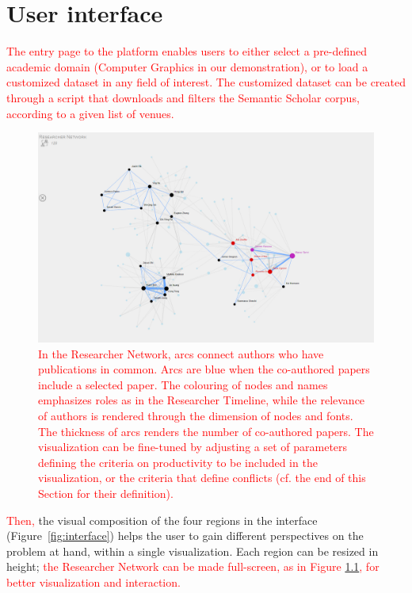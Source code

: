 \chapter{User interface}
\label{sec:userinterface}

\textcolor{red}{The entry page to the platform enables users to either select a pre-defined academic domain (Computer Graphics in our demonstration), or to load a customized dataset in any field of interest. The customized dataset can be created through a script that downloads and filters the Semantic Scholar corpus, according to a given list of venues.}

\begin{figure}[!t]
    \centering
    \includegraphics[width=\textwidth]{fig/researcher_network.png}
    \caption{\textcolor{red}{In the Researcher Network, arcs connect authors who have publications in common.  Arcs are blue when the co-authored papers include a selected paper. The colouring of nodes \textcolor{red}{and names} emphasizes roles as in the Researcher Timeline, while the relevance of authors is rendered through the dimension of nodes \textcolor{red}{and fonts}. The thickness of arcs renders the number of co-authored papers. The visualization can be fine-tuned by adjusting a set of parameters defining the criteria on productivity to be included in the visualization, or the criteria that define conflicts (cf. the end of this Section for their definition).}}%
    \label{fig:communities}
\end{figure}

\textcolor{red}{Then,} the visual composition of the four regions in the interface (Figure~\ref{fig:interface}) helps the user to gain different perspectives on the problem at hand, within a single visualization. Each region can be resized in height; \textcolor{red}{the Researcher Network can be made full-screen, as in Figure \ref{fig:communities}, for better visualization and interaction.}

